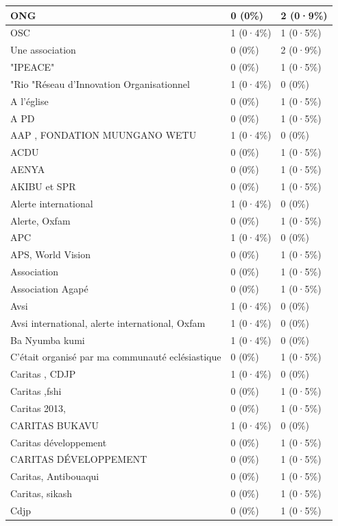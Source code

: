 \documentclass[
]{book}
\begin{document}
\begin{tabular}{l|l|l}
\hline
ONG & 0 (0\%) & 2 (0·9\%)\\
\hline
OSC & 1 (0·4\%) & 1 (0·5\%)\\
\hline
Une association & 0 (0\%) & 2 (0·9\%)\\
\hline
"IPEACE" & 0 (0\%) & 1 (0·5\%)\\
\hline
"Rio "Réseau d'Innovation Organisationnel & 1 (0·4\%) & 0 (0\%)\\
\hline
A l'église & 0 (0\%) & 1 (0·5\%)\\
\hline
A PD & 0 (0\%) & 1 (0·5\%)\\
\hline
AAP , FONDATION MUUNGANO WETU & 1 (0·4\%) & 0 (0\%)\\
\hline
ACDU & 0 (0\%) & 1 (0·5\%)\\
\hline
AENYA & 0 (0\%) & 1 (0·5\%)\\
\hline
AKIBU et SPR & 0 (0\%) & 1 (0·5\%)\\
\hline
Alerte international & 1 (0·4\%) & 0 (0\%)\\
\hline
Alerte, Oxfam & 0 (0\%) & 1 (0·5\%)\\
\hline
APC & 1 (0·4\%) & 0 (0\%)\\
\hline
APS, World Vision & 0 (0\%) & 1 (0·5\%)\\
\hline
Association & 0 (0\%) & 1 (0·5\%)\\
\hline
Association Agapé & 0 (0\%) & 1 (0·5\%)\\
\hline
Avsi & 1 (0·4\%) & 0 (0\%)\\
\hline
Avsi international, alerte international, Oxfam & 1 (0·4\%) & 0 (0\%)\\
\hline
Ba Nyumba kumi & 1 (0·4\%) & 0 (0\%)\\
\hline
C'était organisé par ma communauté eclésiastique & 0 (0\%) & 1 (0·5\%)\\
\hline
Caritas , CDJP & 1 (0·4\%) & 0 (0\%)\\
\hline
Caritas ,fshi & 0 (0\%) & 1 (0·5\%)\\
\hline
Caritas 2013, & 0 (0\%) & 1 (0·5\%)\\
\hline
CARITAS BUKAVU & 1 (0·4\%) & 0 (0\%)\\
\hline
Caritas développement & 0 (0\%) & 1 (0·5\%)\\
\hline
CARITAS DÉVELOPPEMENT & 0 (0\%) & 1 (0·5\%)\\
\hline
Caritas, Antibouaqui & 0 (0\%) & 1 (0·5\%)\\
\hline
Caritas, sikash & 0 (0\%) & 1 (0·5\%)\\
\hline
Cdjp & 0 (0\%) & 1 (0·5\%)\\

\end{tabular}
\end{document}
